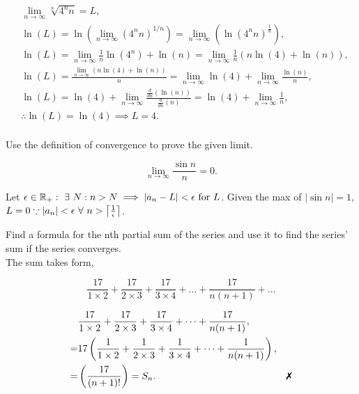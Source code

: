 \documentclass{article}
\begin{document}
            \begin{align*}
                &\lim_{n\rightarrow\infty}\sqrt[n]{4^n n} = L,\\
                &\ln(L) = \ln\left(\lim_{n\rightarrow\infty}(4^n n)^{1/n}\right) = \lim_{n\rightarrow\infty}\left( \ln\left( 4^nn \right)^{\frac{1}{n}} \right),\\
                &\ln(L) = \lim_{n\rightarrow\infty}\frac{1}{n} \ln\left( 4^n \right) + \ln(n) = \lim_{n\rightarrow\infty}\frac{1}{n}(n\ln(4) + \ln(n)),\\
                &\ln(L) = \frac{\lim_{n\rightarrow\infty}(n\ln(4) + \ln(n))}{n} = \lim_{n\rightarrow\infty}\ln(4) + \lim_{n\rightarrow\infty}\frac{\ln(n)}{n},\\
                &\ln(L) = \ln(4) + \lim_{n\rightarrow\infty}\frac{\frac{d}{dn}(\ln(n))}{\frac{d}{dn}(n)} = \ln(4) + \lim_{n\rightarrow\infty}\frac{1}{n},\\
                &\therefore \ln(L) = \ln(4) \implies L = 4.\\
            \end{align*}

            Use the definition of convergence to prove the given limit.

            \[\lim_{n\rightarrow\infty}\frac{\sin n}{n} = 0.\]

            \ans Let $\epsilon \in \mathbb{R}_+ : ~\exists~ N : n > N \implies |a_n - L| < \epsilon \text{ for } L$. Given the max of $|\sin n| = 1$, $L = 0 \because |a_n|<\epsilon ~\forall~ n > \left\lceil\frac{1}{\epsilon}\right\rceil$. 

            Find a formula for the nth partial sum of the series and use it to find the series' sum if the series converges.\\

            The sum takes form,

            \[\frac{17}{1\times2} + \frac{17}{2\times3} + \frac{17}{3\times4} + \dots + \frac{17}{n(n+1)} + \dots\]

            \ans

            \begin{align*}
                &\frac{17}{1\times2} + \frac{17}{2\times3} + \frac{17}{3\times4} + \dots + \frac{17}{n(n+1)},\\
                =&17\left( \frac{1}{1\times2} + \frac{1}{2\times3} + \frac{1}{3\times4} + \dots + \frac{1}{n(n+1)} \right),\\
                =&\left( \frac{17}{(n+1)!} \right) = S_n.&\xmark\\
            \end{align*}
\end{document}
